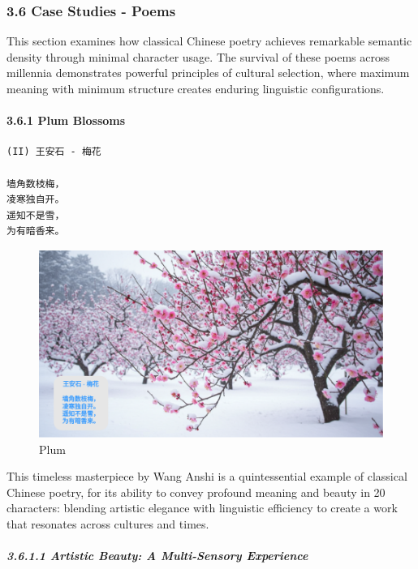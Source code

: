 \documentclass[
  11pt,
  letterpaper,
]{article}
\begin{document}
\hypertarget{case-studies---poems}{%
\subsubsection{3.6 Case Studies - Poems}\label{case-studies---poems}}

This section examines how classical Chinese poetry achieves remarkable
semantic density through minimal character usage. The survival of these
poems across millennia demonstrates powerful principles of cultural
selection, where maximum meaning with minimum structure creates enduring
linguistic configurations.

\hypertarget{plum-blossoms}{%
\paragraph{3.6.1 Plum Blossoms}\label{plum-blossoms}}

\begin{verbatim}
(II) 王安石 - 梅花

墙角数枝梅，
凌寒独自开。
遥知不是雪，
为有暗香来。
\end{verbatim}

\begin{figure}
\centering
\includegraphics{./images/poem_plum.png}
\caption{Plum}
\end{figure}

This timeless masterpiece by Wang Anshi is a quintessential example of
classical Chinese poetry, for its ability to convey profound meaning and
beauty in 20 characters: blending artistic elegance with linguistic
efficiency to create a work that resonates across cultures and times.

\hypertarget{artistic-beauty-a-multi-sensory-experience}{%
\subparagraph{3.6.1.1 Artistic Beauty: A Multi-Sensory
Experience}\label{artistic-beauty-a-multi-sensory-experience}}
\end{document}
